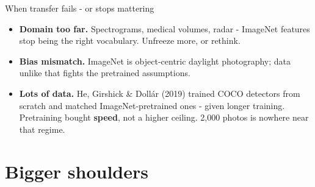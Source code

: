\documentclass[aspectratio=169]{beamer}
\begin{document}
\begin{frame}{When transfer fails - or stops mattering}
  \begin{itemize}\small
    \item \textbf{Domain too far.} Spectrograms, medical volumes, radar - ImageNet
      features stop being the right vocabulary. Unfreeze more, or rethink.
    \item \textbf{Bias mismatch.} ImageNet is object-centric daylight photography; data
      unlike that fights the pretrained assumptions.
    \item \textbf{Lots of data.} He, Girshick \& Doll\'ar (2019) trained COCO detectors from
      scratch and matched ImageNet-pretrained ones - given longer training. Pretraining
      bought \textbf{speed}, not a higher ceiling. 2,000 photos is nowhere near that regime.
  \end{itemize}
  \vskip 4pt
\end{frame}

\section{Bigger shoulders}
\end{document}

